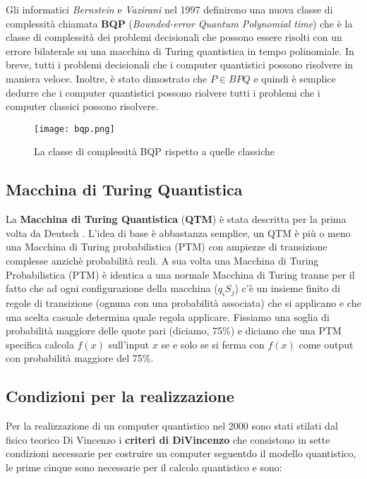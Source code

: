 Gli informatici \textit{Bernstein} e \textit{Vazirani} nel 1997 definirono una nuova classe di complessità chiamata \textbf{BQP} (\textit{Bounded-error Quantum Polynomial time}) che è la classe di complessità dei problemi decisionali che possono essere risolti con un errore bilaterale su una macchina di Turing quantistica in tempo polinomiale. In breve, tutti i problemi decisionali che i computer quantistici possono risolvere in maniera veloce. Inoltre, è stato dimostrato che \( P \in BPQ \) e quindi è semplice dedurre che i computer quantistici possono riolvere tutti i problemi che i computer classici possono risolvere.

\begin{figure}[htbp]
  \centering
  \texttt{[image: bqp.png]}
  \caption{La classe di complessità BQP rispetto a quelle classiche}
  \label{fig:bqp}
\end{figure}

\subsection{Macchina di Turing Quantistica}
La \textbf{Macchina di Turing Quantistica} (\textbf{QTM}) è stata descritta per la prima volta da Deutsch \cite{deutsch1985quantum}. L'idea di base è abbastanza semplice, un QTM è più o meno una Macchina di Turing probabilistica (PTM) con ampiezze di transizione complesse anzichè probabilità reali. A sua volta una Macchina di Turing Probabilistica (PTM) è identica a una normale Macchina di Turing tranne per il fatto che ad ogni configurazione della macchina (\(q_{i}S_{j}\)) c'è un insieme finito di regole di transizione (ognuna con una probabilità associata) che si applicano e che una scelta casuale determina quale regola applicare. Fissiamo una soglia di probabilità maggiore delle quote pari (diciamo, 75\%) e diciamo che una PTM specifica calcola \(f(x)\) sull'input \(x\) se e solo se si ferma con \(f(x)\) come output con probabilità maggiore del 75\%.

\subsection{Condizioni per la realizzazione}
Per la realizzazione di un computer quantistico nel 2000 sono stati stilati dal fisico teorico Di Vincenzo i \textbf{criteri di DiVincenzo} \cite{DiVincenzo_2000} che consistono in sette condizioni necessarie per costruire un computer seguentdo il modello quantistico, le prime cinque sono necessarie per il calcolo quantistico e sono:

